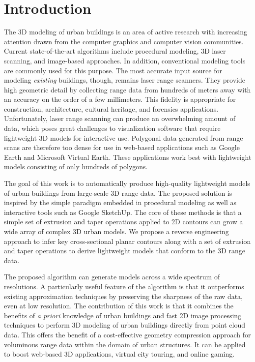 \documentclass[review]{acmsiggraph}       %
\begin{document}
\section{Introduction}
The 3D modeling of urban buildings is an area of active research
with increasing attention drawn from the computer graphics and
computer vision communities.
Current state-of-the-art algorithms include procedural modeling,
3D laser scanning, and image-based approaches.
In addition, conventional modeling tools are commonly used for this purpose.
The most accurate input source for modeling {\it existing} buildings, though,
remains laser range scanners.
They provide high geometric detail by collecting range data from hundreds
of meters away with an accuracy on the order of a few millimeters.
This fidelity is appropriate for construction, architecture, cultural
heritage, and forensics applications.
Unfortunately, laser range scanning can produce an overwhelming amount of data,
which poses great challenges to visualization software that require lightweight
3D models for interactive use.
Polygonal data generated from range scans are therefore too dense for use in
web-based applications such as Google Earth and Microsoft Virtual Earth.
These applications work best with lightweight models consisting of only
hundreds of polygons.

The goal of this work is to automatically produce high-quality
lightweight models of urban buildings from large-scale 3D range data.
The proposed solution is inspired by the simple paradigm embedded in
procedural modeling as well as interactive tools such as Google SketchUp.
The core of these methods is that a simple set of extrusion and taper
operations applied to 2D contours can grow a wide array of complex 3D urban
models.
We propose a reverse engineering approach to infer key cross-sectional
planar contours along with a set of extrusion and taper operations to derive
lightweight models that conform to the 3D range data.

The proposed algorithm can generate models across a wide spectrum of
resolutions.
A particularly useful feature of the algorithm is that it outperforms
existing approximation techniques by preserving the sharpness of the raw
data, even at low resolution.
The contribution of this work is that it combines the benefits of
\emph{a priori} knowledge of urban buildings and fast 2D image
processing techniques to perform 3D modeling of urban buildings directly
from point cloud data.
This offers the benefit of a cost-effective geometry compression
approach for voluminous range data within the domain of urban structures.
It can be applied to boost web-based 3D applications, virtual city touring,
and online gaming.
\end{document}
